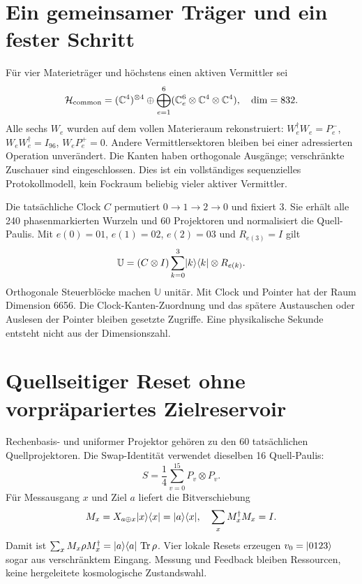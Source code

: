\section{Ein gemeinsamer Träger und ein fester Schritt}
Für vier Materieträger und höchstens einen aktiven Vermittler sei
\begin{equation}
\mathcal H_{\mathrm{common}}=(\mathbb C^4)^{\otimes4}\oplus
\bigoplus_{e=1}^{6}(\mathbb C^6_e\otimes\mathbb C^4\otimes\mathbb C^4),\quad \dim=832.
\end{equation}
Alle sechs $W_e$ wurden auf dem vollen Materieraum rekonstruiert:
$W_e^\dagger W_e=P^-_e$, $W_eW_e^\dagger=I_{96}$, $W_eP^+_e=0$.
Andere Vermittlersektoren bleiben bei einer adressierten Operation unverändert. Die Kanten haben orthogonale Ausgänge; verschränkte Zuschauer sind eingeschlossen. Dies ist ein vollständiges sequenzielles Protokollmodell, kein Fockraum beliebig vieler aktiver Vermittler.

Die tatsächliche Clock $C$ permutiert $0\to1\to2\to0$ und fixiert 3. Sie erhält alle 240 phasenmarkierten Wurzeln und 60 Projektoren und normalisiert die Quell-Paulis. Mit $e(0)=01$, $e(1)=02$, $e(2)=03$ und $R_{e(3)}=I$ gilt
\begin{equation}
\mathbb U=(C\otimes I)\sum_{k=0}^{3}\lvert k\rangle\langle k\rvert\otimes R_{e(k)}.
\end{equation}
Orthogonale Steuerblöcke machen $\mathbb U$ unitär. Mit Clock und Pointer hat der Raum Dimension 6656. Die Clock-Kanten-Zuordnung und das spätere Austauschen oder Auslesen der Pointer bleiben gesetzte Zugriffe. Eine physikalische Sekunde entsteht nicht aus der Dimensionszahl.

\section{Quellseitiger Reset ohne vorpräpariertes Zielreservoir}
Rechenbasis- und uniformer Projektor gehören zu den 60 tatsächlichen Quellprojektoren. Die Swap-Identität verwendet dieselben 16 Quell-Paulis:
\begin{equation}
S=\frac14\sum_{v=0}^{15}P_v\otimes P_v.
\end{equation}
Für Messausgang $x$ und Ziel $a$ liefert die Bitverschiebung
\begin{equation}
M_x=X_{a\oplus x}\lvert x\rangle\langle x\rvert=\lvert a\rangle\langle x\rvert,\quad
\sum_xM_x^\dagger M_x=I.
\end{equation}
Damit ist $\sum_xM_x\rho M_x^\dagger=\lvert a\rangle\langle a\rvert\,\operatorname{Tr}\rho$. Vier lokale Resets erzeugen $v_0=\lvert0123\rangle$ sogar aus verschränktem Eingang. Messung und Feedback bleiben Ressourcen, keine hergeleitete kosmologische Zustandswahl.


